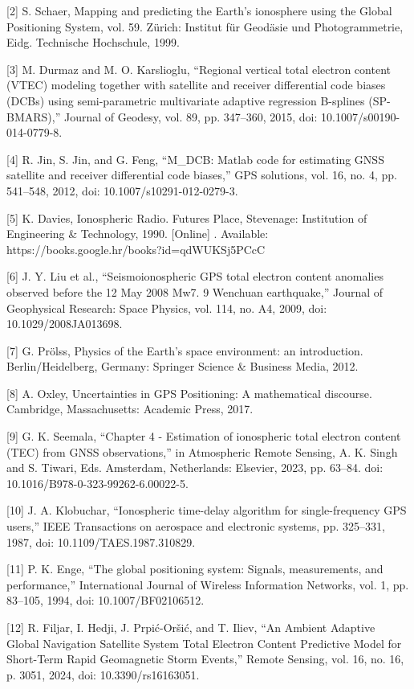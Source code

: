 \let\LaTeXcline\cline\documentclass[sn-mathphys-num]{sn-jnl}\let\cline\LaTeXcline
\begin{document}
[2] S. Schaer, Mapping and predicting the Earth’s ionosphere using the Global Positioning System, vol. 59. Zürich: Institut für Geodäsie und Photogrammetrie, Eidg. Technische Hochschule, 1999.

[3] M. Durmaz and M. O. Karslioglu, “Regional vertical total electron content (VTEC) modeling together with satellite and receiver differential code biases (DCBs) using semi-parametric multivariate adaptive regression B-splines (SP-BMARS),” Journal of Geodesy, vol. 89, pp. 347–360, 2015, doi: 10.1007/s00190-014-0779-8.

[4] R. Jin, S. Jin, and G. Feng, “M_DCB: Matlab code for estimating GNSS satellite and receiver differential code biases,” GPS solutions, vol. 16, no. 4, pp. 541–548, 2012, doi: 10.1007/s10291-012-0279-3.

[5] K. Davies, Ionospheric Radio. Futures Place, Stevenage: Institution of Engineering & Technology, 1990. [Online] . Available: https://books.google.hr/books?id=qdWUKSj5PCcC

[6] J. Y. Liu et al., “Seismoionospheric GPS total electron content anomalies observed before the 12 May 2008 Mw7. 9 Wenchuan earthquake,” Journal of Geophysical Research: Space Physics, vol. 114, no. A4, 2009, doi: 10.1029/2008JA013698.

[7] G. Prölss, Physics of the Earth’s space environment: an introduction. Berlin/Heidelberg, Germany: Springer Science & Business Media, 2012.

[8] A. Oxley, Uncertainties in GPS Positioning: A mathematical discourse. Cambridge, Massachusetts: Academic Press, 2017.

[9] G. K. Seemala, “Chapter 4 - Estimation of ionospheric total electron content (TEC) from GNSS observations,” in Atmospheric Remote Sensing, A. K. Singh and S. Tiwari, Eds. Amsterdam, Netherlands: Elsevier, 2023, pp. 63–84. doi: 10.1016/B978-0-323-99262-6.00022-5.

[10] J. A. Klobuchar, “Ionospheric time-delay algorithm for single-frequency GPS users,” IEEE Transactions on aerospace and electronic systems, pp. 325–331, 1987, doi: 10.1109/TAES.1987.310829.

[11] P. K. Enge, “The global positioning system: Signals, measurements, and performance,” International Journal of Wireless Information Networks, vol. 1, pp. 83–105, 1994, doi: 10.1007/BF02106512.

[12] R. Filjar, I. Hedji, J. Prpić-Oršić, and T. Iliev, “An Ambient Adaptive Global Navigation Satellite System Total Electron Content Predictive Model for Short-Term Rapid Geomagnetic Storm Events,” Remote Sensing, vol. 16, no. 16, p. 3051, 2024, doi: 10.3390/rs16163051.
\end{document}
